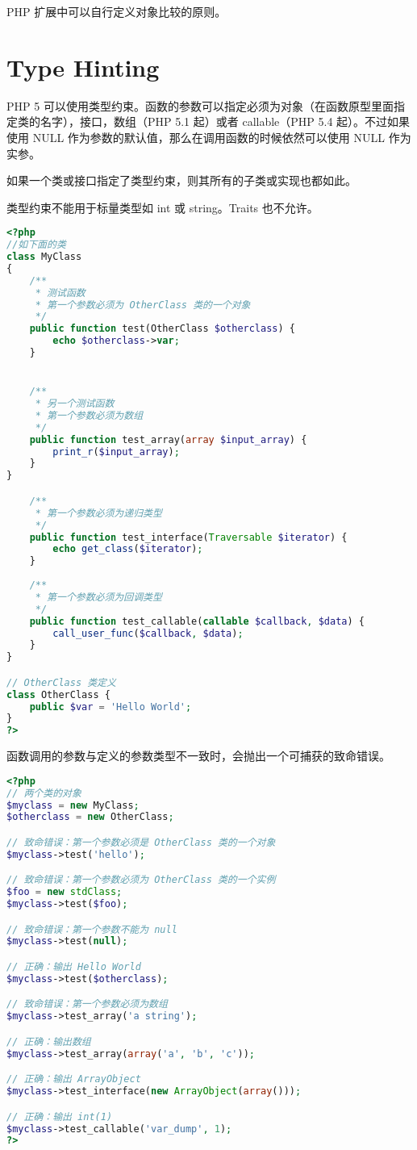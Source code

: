 PHP 扩展中可以自行定义对象比较的原则。


\chapter{Type Hinting}

PHP 5 可以使用类型约束。函数的参数可以指定必须为对象（在函数原型里面指定类的名字），接口，数组（PHP 5.1 起）或者 callable（PHP 5.4 起）。不过如果使用 NULL 作为参数的默认值，那么在调用函数的时候依然可以使用 NULL 作为实参。

如果一个类或接口指定了类型约束，则其所有的子类或实现也都如此。

类型约束不能用于标量类型如 int 或 string。Traits 也不允许。



\begin{lstlisting}[language=PHP]
<?php
//如下面的类
class MyClass
{
    /**
     * 测试函数
     * 第一个参数必须为 OtherClass 类的一个对象
     */
    public function test(OtherClass $otherclass) {
        echo $otherclass->var;
    }


    /**
     * 另一个测试函数
     * 第一个参数必须为数组 
     */
    public function test_array(array $input_array) {
        print_r($input_array);
    }
}

    /**
     * 第一个参数必须为递归类型
     */
    public function test_interface(Traversable $iterator) {
        echo get_class($iterator);
    }
    
    /**
     * 第一个参数必须为回调类型
     */
    public function test_callable(callable $callback, $data) {
        call_user_func($callback, $data);
    }
}

// OtherClass 类定义
class OtherClass {
    public $var = 'Hello World';
}
?>
\end{lstlisting}

函数调用的参数与定义的参数类型不一致时，会抛出一个可捕获的致命错误。

\begin{lstlisting}[language=PHP]
<?php
// 两个类的对象
$myclass = new MyClass;
$otherclass = new OtherClass;

// 致命错误：第一个参数必须是 OtherClass 类的一个对象
$myclass->test('hello');

// 致命错误：第一个参数必须为 OtherClass 类的一个实例
$foo = new stdClass;
$myclass->test($foo);

// 致命错误：第一个参数不能为 null
$myclass->test(null);

// 正确：输出 Hello World 
$myclass->test($otherclass);

// 致命错误：第一个参数必须为数组
$myclass->test_array('a string');

// 正确：输出数组
$myclass->test_array(array('a', 'b', 'c'));

// 正确：输出 ArrayObject
$myclass->test_interface(new ArrayObject(array()));

// 正确：输出 int(1)
$myclass->test_callable('var_dump', 1);
?>
\end{lstlisting}

